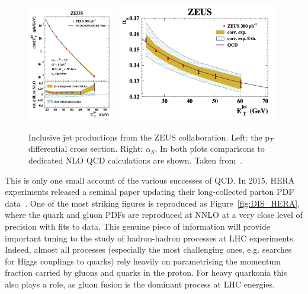 \begin{figure}[htb]
\begin{center}
  \includegraphics[width=0.35\textwidth]{Chapters/pQCD/zeus_jetCS.png}
  \includegraphics[width=0.63\textwidth]{Chapters/pQCD/alpha_s_zeus.png}
 \caption{Inclusive jet productions from the ZEUS collaboration. Left:
   the p$_{T}$ differential cross section. Right: $\alpha_{S}$. In both
   plots comparisons to dedicated NLO QCD calculations are shown. Taken from~\cite{Paul}.}
 \label{fig:zeus}
\end{center}
\end{figure}

This is only one small account of the various successes of QCD. In 2015, HERA experiments released a seminal paper
updating their long-collected parton PDF data~\cite{HERA_END}. One of the most
striking figures is reproduced as
Figure~\ref{fig:DIS_HERA}, where the quark and gluon PDFs are
reproduced at NNLO at a very close level of precision with fits
to data. This genuine piece of information will provide important
tuning to the study of hadron-hadron processes at LHC experiments. Indeed, almost all
processes (especially the most challenging ones, e.g. searches for Higgs
couplings to quarks) rely heavily on parametrising the momentum fraction carried by
gluons and quarks in the proton. For heavy quarkonia this also plays a
role, as gluon fusion is the dominant process at
LHC energies.

